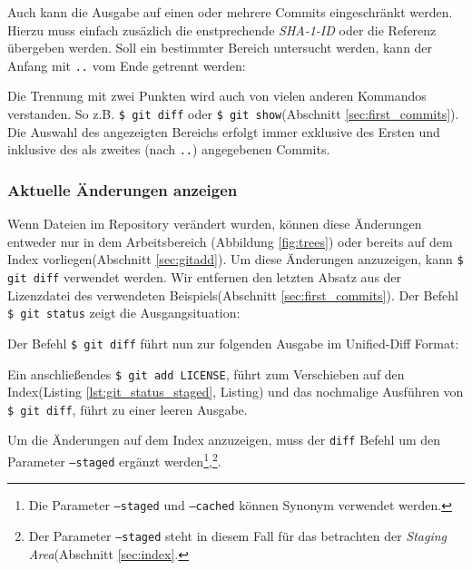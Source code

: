 Auch kann die Ausgabe auf einen oder mehrere Commits eingeschränkt werden.
Hierzu muss einfach zusäzlich die enstprechende \textit{SHA-1-ID} oder die
Referenz übergeben werden. Soll ein bestimmter Bereich untersucht werden, kann
der Anfang mit \texttt{..} vom Ende getrennt werden:


Die Trennung mit zwei Punkten wird auch von vielen anderen Kommandos
verstanden. So z.B. \texttt{\$ git diff} oder \texttt{\$ git show}(Abschnitt
\ref{sec:first_commits}). Die Auswahl des angezeigten Bereichs erfolgt immer
exklusive des Ersten und inklusive des als zweites (nach \texttt{..}) angegebenen
Commits.\cite[45-48]{gitosp}

\subsubsection{Aktuelle Änderungen anzeigen}\label{sec:gitdiff}
Wenn Dateien im Repository verändert wurden, können diese Änderungen entweder
nur in dem Arbeitsbereich (Abbildung \ref{fig:trees}) oder bereits auf dem
Index vorliegen(Abschnitt \ref{sec:gitadd}). Um diese Änderungen anzuzeigen,
kann \texttt{\$ git diff} verwendet werden. Wir entfernen den
letzten Absatz aus der Lizenzdatei des verwendeten Beispiels(Abschnitt
\ref{sec:first_commits}). Der Befehl \texttt{\$ git status} zeigt die
Ausgangsituation:


Der Befehl \texttt{\$ git diff} führt nun zur folgenden Ausgabe im Unified-Diff
Format:


Ein anschließendes \texttt{\$ git add LICENSE}, führt zum Verschieben auf den
Index(Listing \ref{lst:git_status_staged}, Listing) und das nochmalige
Ausführen von \texttt{\$ git diff}, führt zu einer leeren Ausgabe.


Um die Änderungen auf dem Index anzuzeigen, muss der \texttt{diff} Befehl um
den Parameter \texttt{--staged} ergänzt werden\footnote{Die Parameter
\texttt{--staged} und \texttt{--cached} können Synonym verwendet
werden.},\footnote{Der Parameter \texttt{--staged} steht in diesem Fall für das
betrachten der \textit{Staging Area}(Abschnitt
\ref{sec:index}.}.\cite[26-29]{progit}
